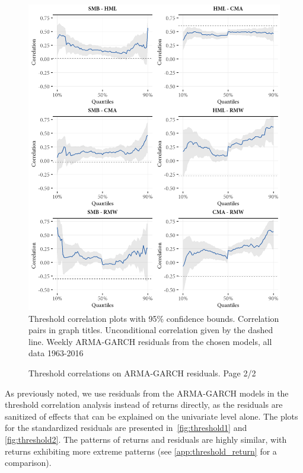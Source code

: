 \begin{figure}[htbp]
  \caption{Threshold correlations on ARMA-GARCH residuals. Page 2/2}
  \label{fig:threshold2}
  \centering
  \begin{minipage}{\textwidth}
  \includegraphics[scale=1]{graphics/threshold2.png}  
  \vspace{3mm}
  \footnotesize
  Threshold correlation plots with 95\% confidence bounds. Correlation pairs in graph titles. Unconditional correlation given by the dashed line. Weekly ARMA-GARCH residuals from the chosen models, all data 1963-2016
  \end{minipage}
\end{figure}

As previously noted, we use residuals from the ARMA-GARCH models in the threshold correlation analysis instead of returns directly, as the residuals are sanitized of effects that can be explained on the univariate level alone. The plots for the standardized residuals are presented in~\autoref{fig:threshold1} and \autoref{fig:threshold2}. The patterns of returns and residuals are highly similar, with returns exhibiting more extreme patterns (see \autoref{app:threshold_return} for a comparison).

